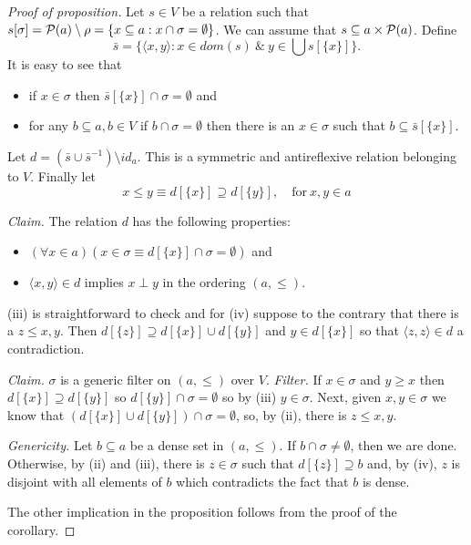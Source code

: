 \begin{proof}[Proof of proposition] Let $s\in V$ be a relation such that $s[\sigma]={{\mathcal P}}(a)\setminus\rho=\{x\subseteq a:x\cap\sigma=\emptyset\}$.
We can assume that $s\subseteq a\times{{\mathcal P}}(a)$. Define
$$
\bar{s}=\{\langle x,y\rangle:x\in dom(s)\ \&\ y\in\bigcup s[\{x\}]\}.
$$
It is easy to see that
\begin{itemize}
 \item[(i)] if $x\in\sigma$ then $\bar{s}[\{x\}]\cap \sigma=\emptyset$ and
 \item[(ii)] for any $b\subseteq a,b\in V$ if $b\cap \sigma=\emptyset$ then
 there is an $x\in\sigma$ such that $b\subseteq\bar{s}[\{x\}]$.
\end{itemize}

Let $d=(\bar{s}\cup\bar{s}^{-1})\setminus id_a$. This is a symmetric and antireflexive
relation belonging to $V$. Finally let
$$
x\leq y\equiv d[\{x\}]\supseteq d[\{y\}],\quad \mbox{for}\ x,y\in a
$$

\emph{Claim.} The relation $d$ has the following properties:
 \begin{itemize}
  \item[(iii)] $(\forall x\in a)(x\in\sigma\equiv d[\{x\}]\cap\sigma=\emptyset)$ and
  \item[(iv)] $\langle x,y\rangle\in d$ implies $x\perp y$ in the ordering $(a,\leq)$.
 \end{itemize}
(iii) is straightforward to check and for (iv) suppose to the contrary that there is a $z\leq x,y$.
Then $d[\{z\}]\supseteq d[\{x\}]\cup d[\{y\}]$ and $y\in d[\{x\}]$ so that $\langle z,z\rangle\in d$
a contradiction.

\emph{Claim.} $\sigma$ is a generic filter on $(a,\leq)$ over $V$.
\emph{Filter.} If $x\in\sigma$ and $y\geq x$ then $d[\{x\}]\supseteq d[\{y\}]$ so $d[\{y\}]\cap\sigma=\emptyset$
so by (iii) $y\in\sigma$. Next, given $x,y\in\sigma$ we know that $(d[\{x\}]\cup d[\{y\}])\cap\sigma=\emptyset$,
so, by (ii), there is $z\leq x,y$.

\emph{Genericity.} Let $b\subseteq a$ be a dense set in $(a,\leq)$. If $b\cap\sigma\neq\emptyset$, then
we are done. Otherwise, by (ii) and (iii), there is $z\in\sigma$ such that $d[\{z\}]\supseteq b$ and, by (iv), $z$
is disjoint with all elements of $b$ which contradicts the fact that $b$ is dense.

The other implication in the proposition follows from the proof of the corollary.
\end{proof}


